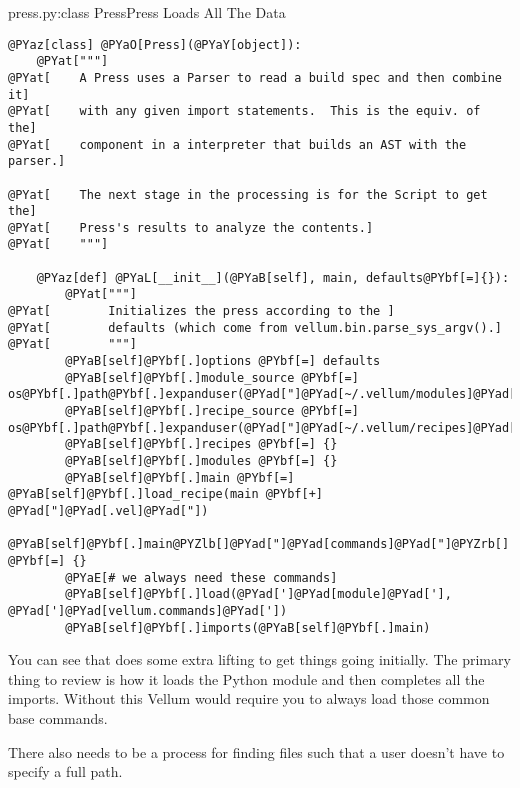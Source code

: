 \begin{code}{press.py:class Press}{Press Loads All The Data}
\begin{Verbatim}[commandchars=@\[\]]
@PYaz[class] @PYaO[Press](@PYaY[object]):
    @PYat["""]
@PYat[    A Press uses a Parser to read a build spec and then combine it]
@PYat[    with any given import statements.  This is the equiv. of the]
@PYat[    component in a interpreter that builds an AST with the parser.]

@PYat[    The next stage in the processing is for the Script to get the]
@PYat[    Press's results to analyze the contents.]
@PYat[    """]

    @PYaz[def] @PYaL[__init__](@PYaB[self], main, defaults@PYbf[=]{}):
        @PYat["""]
@PYat[        Initializes the press according to the ]
@PYat[        defaults (which come from vellum.bin.parse_sys_argv().]
@PYat[        """]
        @PYaB[self]@PYbf[.]options @PYbf[=] defaults
        @PYaB[self]@PYbf[.]module_source @PYbf[=] os@PYbf[.]path@PYbf[.]expanduser(@PYad["]@PYad[~/.vellum/modules]@PYad["])
        @PYaB[self]@PYbf[.]recipe_source @PYbf[=]  os@PYbf[.]path@PYbf[.]expanduser(@PYad["]@PYad[~/.vellum/recipes]@PYad["])
        @PYaB[self]@PYbf[.]recipes @PYbf[=] {}
        @PYaB[self]@PYbf[.]modules @PYbf[=] {}
        @PYaB[self]@PYbf[.]main @PYbf[=] @PYaB[self]@PYbf[.]load_recipe(main @PYbf[+] @PYad["]@PYad[.vel]@PYad["])
        @PYaB[self]@PYbf[.]main@PYZlb[]@PYad["]@PYad[commands]@PYad["]@PYZrb[] @PYbf[=] {}
        @PYaE[# we always need these commands]
        @PYaB[self]@PYbf[.]load(@PYad[']@PYad[module]@PYad['], @PYad[']@PYad[vellum.commands]@PYad['])
        @PYaB[self]@PYbf[.]imports(@PYaB[self]@PYbf[.]main)
\end{Verbatim}

\end{code}

You can see that  does some extra lifting to get
things going initially.  The primary thing to review is how it loads the
 Python module and then completes all the imports.
Without this Vellum would require you to always load those common base commands.

There also needs to be a process for finding files such that a user doesn't have
to specify a full path.


